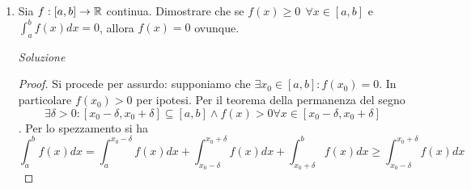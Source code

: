 \documentclass{article}
\newcommand{\se}{\text{ se }}
\renewcommand{\phi}{\varphi}
\begin{document}
\begin{enumerate}[label=\textbf{Esercizio 10.\arabic*.},itemindent=*]
    \paragraph*{Ricorda}(linearità dell'integrale) $\phi, \psi\in \mathcal{R}([a,b])$ e $\alpha, \beta\in \R$
    \[\int_a^b(\alpha \phi+\beta\psi)dx=\alpha\int_a^b\phi dx+\beta \int_a^b\psi dx\]
\begin{proof}
    Non è restrittivo supporre $f(x_0)>g(x_0)$. Definiamo
    \[h(x):=f(x)-g(x)=\begin{cases}
        0&\se x\neq x_0\\
        f(x_0)-g(x_0)&\se x=x_0
    \end{cases}\]
    e dimostriamo che $h$ è Riemann integrabile. Equivalentemente dimostriamo che 
    \[\forall \varepsilon>0~~\exists \mathcal{D}:S(\mathcal{D},h)-s(\mathcal{D},h)<\varepsilon\]
    Fissiamo $\varepsilon$ e definiamo
    \[\mathcal{D}_\varepsilon=\left\{a,x_0-\frac{\epsilon}{4h(x_0)},x_0+\frac{\epsilon}{4h(x_0)}, b\right\}\]
    Si ottiene che 
    \[s(\mathcal{D}_\varepsilon, h)=0\]
    infatti l'$\inf$ di qualsiasi intervallo è 0. Si ha inoltre che
    \[\begin{align}S(\mathcal{D}_\epsilon, h)&=\cancel{(x_1-a)\sup_{[a,x_1]}f}(x_2-x_1)(h(x_0))+\cancel{(b-x_2)\sup_{[x_2,b]}f}=(x_1-x_2)(h(x_0))=\\&=\left[\cancel{x_0}+\frac{\varepsilon}{4h(x_0)}-x_0+\frac{\varepsilon}{4h(x_0)}\right]h(x_0)=h(x_0)\frac{\varepsilon}{2h(x_0)}=\frac{\varepsilon}{2}<\varepsilon\end{align}\]
$h$ è quindi Riemann integrabile, di conseguenza per linearità $g=f-h$ è Riemann integrabile. Rimane ora da dimostrare che $\int_a^bf(x)dx=\int_a^bg(x)dx$. Dimostriamo equivalentemente che $\int_a^bh(x)dx=0$. Osserviamo che le somme inferiori sono sempre 0, mentre le somme superiori risultano $\frac{\varepsilon}{2}$, quindi facendo tendere $\varepsilon$ a 0 si ottiene che 
\[0=s(\mathcal{D})\leq \int_a^bh(x)dx\leq \frac{\varepsilon}{2}\]
\[\implies \int_a^bh(x)dx=0\]
\end{proof}
\item Sia $f:[a,b]\to\mathbb{R}$ continua. Dimostrare che se $f(x)\geq 0 ~~\forall x  \in [a,b]$ e $\int_a^bf(x)dx=0$, allora $f(x)=0$ ovunque. 
\item[\textit{\large Soluzione~}]~
\begin{proof}
    Si procede per assurdo: supponiamo che $\exists x_0\in [a,b]:f(x_0)=0$. In particolare $f(x_0)>0$ per ipotesi. Per il teorema della permanenza del segno \[\exists \delta >0:[x_0-\delta,x_0+\delta]\subseteq [a,b] \land f(x)>0\forall x\in [x_0-\delta,x_0+\delta]\]. Per lo spezzamento si ha\[\int_a^bf(x)dx=\int_a^{x_0-\delta}f(x)dx+\int_{x_0-\delta}^{x_0+\delta}f(x)dx+\int_{x_0+\delta}^bf(x)dx\geq \int_{x_0-\delta}^{x_0+\delta}f(x)dx\]

\end{proof}
\end{enumerate}
\end{document}
